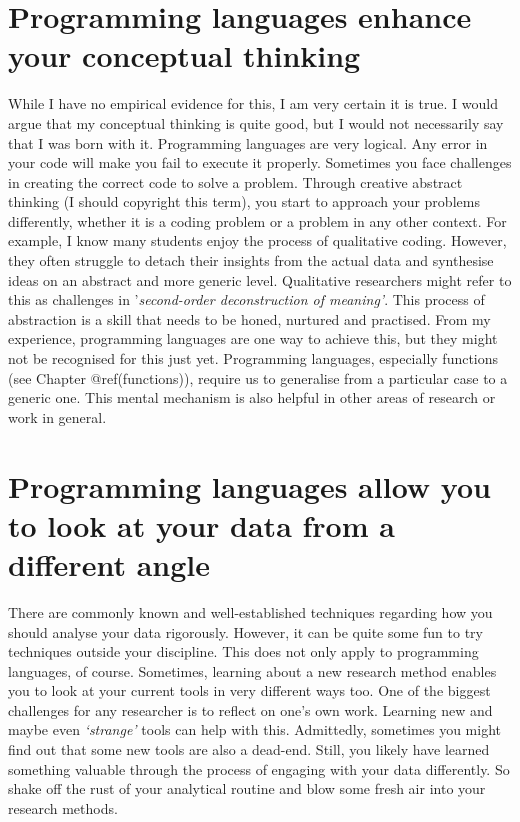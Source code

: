 \documentclass[
  letterpaper,
]{krantz}
\begin{document}
\section{Programming languages enhance your conceptual
thinking}\label{programming-languages-enhance-your-conceptual-thinking}

While I have no empirical evidence for this, I am very certain it is
true. I would argue that my conceptual thinking is quite good, but I
would not necessarily say that I was born with it. Programming languages
are very logical. Any error in your code will make you fail to execute
it properly. Sometimes you face challenges in creating the correct code
to solve a problem. Through creative abstract thinking (I should
copyright this term), you start to approach your problems differently,
whether it is a coding problem or a problem in any other context. For
example, I know many students enjoy the process of qualitative coding.
However, they often struggle to detach their insights from the actual
data and synthesise ideas on an abstract and more generic level.
Qualitative researchers might refer to this as challenges in
'\emph{second-order deconstruction of meaning'}. This process of
abstraction is a skill that needs to be honed, nurtured and practised.
From my experience, programming languages are one way to achieve this,
but they might not be recognised for this just yet. Programming
languages, especially functions (see Chapter @ref(functions)), require
us to generalise from a particular case to a generic one. This mental
mechanism is also helpful in other areas of research or work in general.

\section{Programming languages allow you to look at your data from a
different
angle}\label{programming-languages-allow-you-to-look-at-your-data-from-a-different-angle}

There are commonly known and well-established techniques regarding how
you should analyse your data rigorously. However, it can be quite some
fun to try techniques outside your discipline. This does not only apply
to programming languages, of course. Sometimes, learning about a new
research method enables you to look at your current tools in very
different ways too. One of the biggest challenges for any researcher is
to reflect on one's own work. Learning new and maybe even
\emph{`strange'} tools can help with this. Admittedly, sometimes you
might find out that some new tools are also a dead-end. Still, you
likely have learned something valuable through the process of engaging
with your data differently. So shake off the rust of your analytical
routine and blow some fresh air into your research methods.
\end{document}
